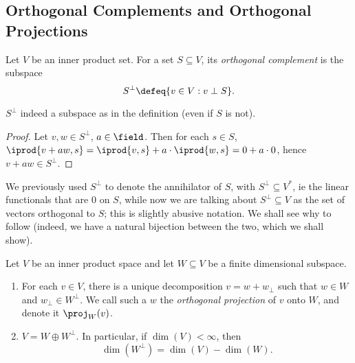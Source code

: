\subsection{Orthogonal Complements and Orthogonal Projections}

\begin{definition}
    Let $V$ be an inner product set. For a set $S \subseteq V$, its \emph{orthogonal complement} is the subspace \[S^\perp \defeq \{v \in V : v \perp S \}.\]
\end{definition}

\begin{proposition}
    $S^\perp$ indeed a subspace as in the definition (even if $S$ is not).
\end{proposition}

\begin{proof}
    Let $v, w \in S^\perp$, $a \in \field$. Then for each $s \in S$, $\iprod{v + aw, s} = \iprod{v, s} + a \cdot \iprod{w, s} = 0 + a \cdot 0$, hence $v + a w \in S^\perp$.
\end{proof}

\begin{remark}
    We previously used $S^\perp$ to denote the annihilator of $S$, with $S^\perp \subseteq V^\ast$, ie the linear functionals that are $0$ on $S$, while now we are talking about $S^\perp \subseteq V$ as the set of vectors orthogonal to $S$; this is slightly abusive notation. We shall see why to follow (indeed, we have a natural bijection between the two, which we shall show).
\end{remark}

\begin{theorem}
    Let $V$ be an inner product space and let $W \subseteq V$ be a finite dimensional subspace.
    \begin{enumerate}[label=(\alph*)]
        \item For each $v \in V$, there is a unique decomposition $v = w + w_\perp$ such that $w \in W$ and $w_\perp \in W^\perp$. We call such a $w$ the \emph{orthogonal projection} of $v$ onto $W$, and denote it $\proj_W(v)$.
        \item $V = W \oplus W^\perp$. In particular, if $\dim(V) < \infty$, then $$\dim(W^\perp) = \dim(V) - \dim(W).$$
    \end{enumerate}
\end{theorem}

